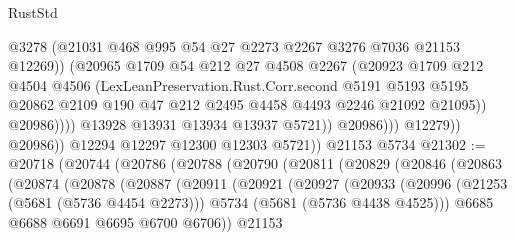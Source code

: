 \begin{lexlean}{RustStd}
\begin{coremodule}
                                  @3278
                                  (@21031 @468 @995 @54 @27 @2273 @2267 @3276 @7036 @21153 @12269))
                                (@20965
                                  @1709
                                  @54
                                  @212
                                  @27
                                  @4508
                                  @2267
                                  (@20923
                                    @1709
                                    @212
                                    @4504
                                    @4506
                                    (LexLeanPreservation.Rust.Corr.second
                                      @5191
                                      @5193
                                      @5195
                                      @20862
                                      @2109
                                      @190
                                      @47
                                      @212
                                      @2495
                                      @4458
                                      @4493
                                      @2246
                                      @21092
                                      @21095))
                                  @20986))))
                          @13928
                          @13931
                          @13934
                          @13937
                          @5721))
                      @20986)))
                @12279))
            @20986))
        @12294
        @12297
        @12300
        @12303
        @5721))
    @21153
    @5734
@21302 := @20718
    (@20744
      (@20786
        (@20788
          (@20790
            (@20811
              (@20829
                (@20846
                  (@20863
                    (@20874
                      (@20878
                        (@20887
                          (@20911
                            (@20921
                              (@20927
                                (@20933
                                  (@20996
                                    (@21253 (@5681 (@5736 @4454 @2273)))
                                    @5734
                                    (@5681 (@5736 @4438 @4525)))
                                  @6685
                                  @6688
                                  @6691
                                  @6695
                                  @6700
                                  @6706))
                              @21153

\end{coremodule}
\end{lexlean}
